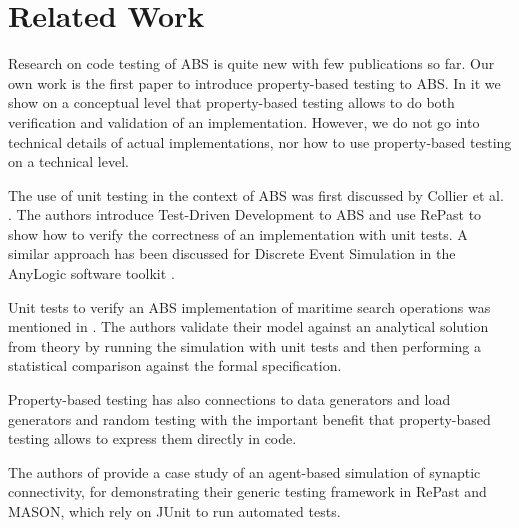 \section{Related Work}
\label{sec:related}
Research on code testing of ABS is quite new with few publications so far. Our own work \cite{thaler_show_2019} is the first paper to introduce property-based testing to ABS. In it we show on a conceptual level that property-based testing allows to do both verification and validation of an implementation. However, we do not go into technical details of actual implementations, nor how to use property-based testing on a technical level.

The use of unit testing in the context of ABS was first discussed by Collier et al. \cite{collier_test-driven_2013}. The authors introduce Test-Driven Development to ABS and use RePast to show how to verify the correctness of an implementation with unit tests. A similar approach has been discussed for Discrete Event Simulation in the AnyLogic software toolkit \cite{asta_investigation_2014}. 

Unit tests to verify an ABS implementation of maritime search operations was mentioned in \cite{onggo_test-driven_2016}. The authors validate their model against an analytical solution from theory by running the simulation with unit tests and then performing a statistical comparison against the formal specification.

Property-based testing has also connections to data generators \cite{gurcan_generic_2013} and load generators and random testing \cite{burnstein_practical_2010} with the important benefit that property-based testing allows to express them directly in code.

The authors of \cite{gurcan_generic_2013} provide a case study of an agent-based simulation of synaptic connectivity, for demonstrating their generic testing framework in RePast and MASON, which rely on JUnit to run automated tests.